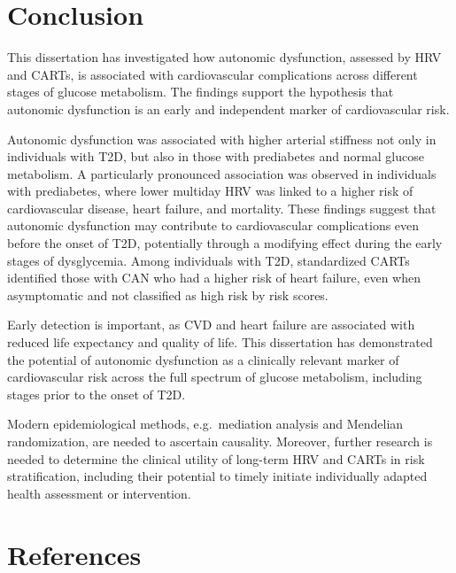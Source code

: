 \documentclass[
  a4paper,
  headsepline=true,
  open=left]{scrbook}
\begin{document}
\clearpage
\null
\thispagestyle{empty}
\clearpage


\hypertarget{conclusion}{%
\chapter{Conclusion}\label{conclusion}}

\clearpage
\null
\thispagestyle{empty}
\clearpage

This dissertation has investigated how autonomic dysfunction, assessed
by HRV and CARTs, is associated with cardiovascular complications across
different stages of glucose metabolism. The findings support the
hypothesis that autonomic dysfunction is an early and independent marker
of cardiovascular risk.

Autonomic dysfunction was associated with higher arterial stiffness not
only in individuals with T2D, but also in those with prediabetes and
normal glucose metabolism. A particularly pronounced association was
observed in individuals with prediabetes, where lower multiday HRV was
linked to a higher risk of cardiovascular disease, heart failure, and
mortality. These findings suggest that autonomic dysfunction may
contribute to cardiovascular complications even before the onset of T2D,
potentially through a modifying effect during the early stages of
dysglycemia. Among individuals with T2D, standardized CARTs identified
those with CAN who had a higher risk of heart failure, even when
asymptomatic and not classified as high risk by risk scores.

Early detection is important, as CVD and heart failure are associated
with reduced life expectancy and quality of life. This dissertation has
demonstrated the potential of autonomic dysfunction as a clinically
relevant marker of cardiovascular risk across the full spectrum of
glucose metabolism, including stages prior to the onset of T2D.

Modern epidemiological methods, e.g.~mediation analysis and Mendelian
randomization, are needed to ascertain causality. Moreover, further
research is needed to determine the clinical utility of long-term HRV
and CARTs in risk stratification, including their potential to timely
initiate individually adapted health assessment or intervention.

\clearpage
\null
\thispagestyle{empty}
\clearpage


\hypertarget{references}{%
\chapter*{References}\label{references}}
\end{document}
